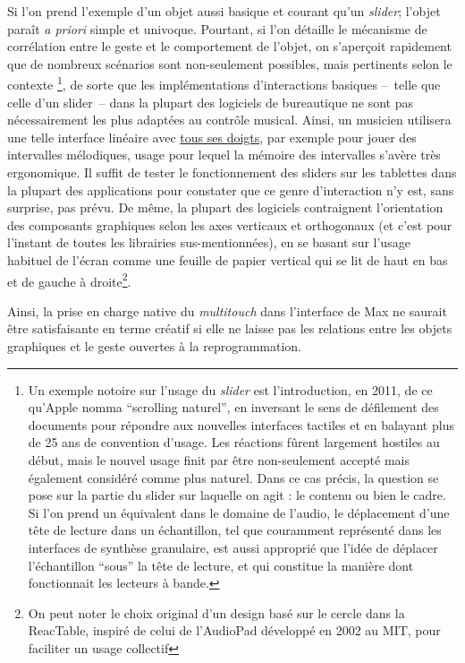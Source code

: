 \indent Si l'on prend l'exemple d'un objet aussi basique et courant qu'un \textit{slider}; l'objet paraît \textit{a priori} simple et univoque. Pourtant, si l'on détaille le mécanisme de corrélation entre le geste et le comportement de l'objet, on s'aperçoit rapidement que de nombreux scénarios sont non-seulement possibles, mais pertinents selon le contexte \footnote{Un exemple notoire sur l'usage du \textit{slider} est l'introduction, en 2011, de ce qu'Apple nomma ``scrolling naturel'', en inversant le sens de défilement des documents pour répondre aux nouvelles interfaces tactiles et en balayant plus de 25 ans de convention d'usage. Les réactions fûrent largement hostiles au début, mais le nouvel usage finit par être non-seulement accepté mais également considéré comme plus naturel. Dans ce cas précis, la question se pose sur la partie du slider sur laquelle on agit : le contenu ou bien le cadre. Si l'on prend un équivalent dans le domaine de l'audio, le déplacement d'une tête de lecture dans un échantillon, tel que couramment représenté dans les interfaces de synthèse granulaire, est aussi approprié que l'idée de déplacer l'échantillon ``sous'' la tête de lecture, et qui constitue la manière dont fonctionnait les lecteurs à bande.}, de sorte que les implémentations d'interactions basiques --~telle que celle d'un slider~-- dans la plupart des logiciels de bureautique ne sont pas nécessairement les plus adaptées au contrôle musical. Ainsi, un musicien utilisera une telle interface linéaire avec \underline{tous ses doigts}, par exemple pour jouer des intervalles mélodiques, usage pour lequel la mémoire des intervalles s'avère très ergonomique. Il suffit de tester le fonctionnement des sliders sur les tablettes dans la plupart des applications pour constater que ce genre d'interaction n'y est, sans surprise, pas prévu. De même, la plupart des logiciels contraignent l'orientation des composants graphiques selon les axes verticaux et orthogonaux (et c'est pour l'instant de toutes les librairies sus-mentionnées), en se basant sur l'usage habituel de l'écran comme une feuille de papier vertical qui se lit de haut en bas et de gauche à droite\footnote{On peut noter le choix original d'un design basé sur le cercle dans la ReacTable, inspiré de celui de l'AudioPad développé en 2002 au \gls{MIT}, pour faciliter un usage collectif}.

Ainsi, la prise en charge native du \textit{multitouch} dans l'interface de Max ne saurait être satisfaisante en terme créatif si elle ne laisse pas les relations entre les objets graphiques et le geste ouvertes à la reprogrammation. 


